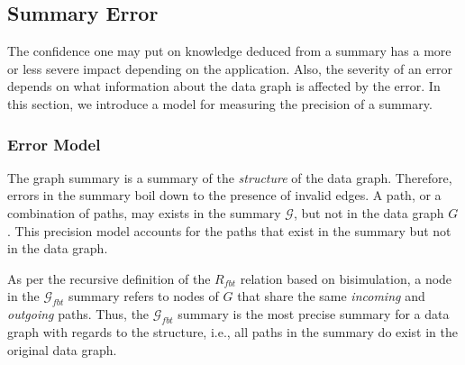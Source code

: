 \subsection{Summary Error}

The confidence one may put on knowledge deduced from a summary has a more or less severe impact depending on the application. Also, the severity of an error depends on what information about the data graph is affected by the error. In this section, we introduce a model for measuring the precision of a summary.

\subsubsection{Error Model}

The graph summary is a summary of the \emph{structure} of the data graph. Therefore, errors in the summary boil down to the presence of invalid edges. A path, or a combination of paths, may exists in the summary $\mathcal{G}$, but not in the data graph $G$. This precision model accounts for the paths that exist in the summary but not in the data graph.

%

As per the recursive definition of the $R_{fbt}$ relation based on bisimulation, a node in the $\mathcal{G}_{fbt}$ summary refers to nodes of $G$ that share the same \emph{incoming} and \emph{outgoing} paths. Thus, the $\mathcal{G}_{fbt}$ summary is the most precise summary for a data graph with regards to the structure, i.e., all paths in the summary do exist in the original data graph.

